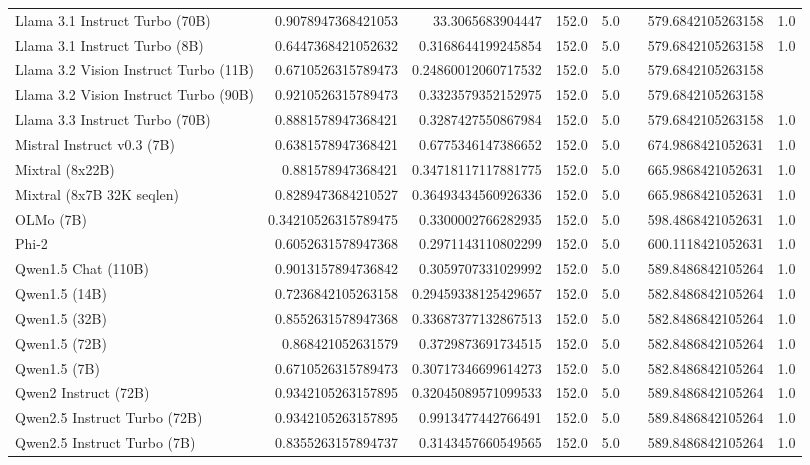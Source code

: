\begin{table}[htp]
{\begin{tabular}{lrrrrrrr}
Llama 3.1 Instruct Turbo (70B) & 0.9078947368421053 & 33.3065683904447 & 152.0 & 5.0 &  & 579.6842105263158 & 1.0 \\
Llama 3.1 Instruct Turbo (8B) & 0.6447368421052632 & 0.3168644199245854 & 152.0 & 5.0 &  & 579.6842105263158 & 1.0 \\
Llama 3.2 Vision Instruct Turbo (11B) & 0.6710526315789473 & 0.24860012060717532 & 152.0 & 5.0 &  & 579.6842105263158 &  \\
Llama 3.2 Vision Instruct Turbo (90B) & 0.9210526315789473 & 0.3323579352152975 & 152.0 & 5.0 &  & 579.6842105263158 &  \\
Llama 3.3 Instruct Turbo (70B) & 0.8881578947368421 & 0.3287427550867984 & 152.0 & 5.0 &  & 579.6842105263158 & 1.0 \\
Mistral Instruct v0.3 (7B) & 0.6381578947368421 & 0.6775346147386652 & 152.0 & 5.0 &  & 674.9868421052631 & 1.0 \\
Mixtral (8x22B) & 0.881578947368421 & 0.34718117117881775 & 152.0 & 5.0 &  & 665.9868421052631 & 1.0 \\
Mixtral (8x7B 32K seqlen) & 0.8289473684210527 & 0.36493434560926336 & 152.0 & 5.0 &  & 665.9868421052631 & 1.0 \\
OLMo (7B) & 0.34210526315789475 & 0.3300002766282935 & 152.0 & 5.0 &  & 598.4868421052631 & 1.0 \\
Phi-2 & 0.6052631578947368 & 0.2971143110802299 & 152.0 & 5.0 &  & 600.1118421052631 & 1.0 \\
Qwen1.5 Chat (110B) & 0.9013157894736842 & 0.3059707331029992 & 152.0 & 5.0 &  & 589.8486842105264 & 1.0 \\
Qwen1.5 (14B) & 0.7236842105263158 & 0.29459338125429657 & 152.0 & 5.0 &  & 582.8486842105264 & 1.0 \\
Qwen1.5 (32B) & 0.8552631578947368 & 0.33687377132867513 & 152.0 & 5.0 &  & 582.8486842105264 & 1.0 \\
Qwen1.5 (72B) & 0.868421052631579 & 0.3729873691734515 & 152.0 & 5.0 &  & 582.8486842105264 & 1.0 \\
Qwen1.5 (7B) & 0.6710526315789473 & 0.30717346699614273 & 152.0 & 5.0 &  & 582.8486842105264 & 1.0 \\
Qwen2 Instruct (72B) & 0.9342105263157895 & 0.32045089571099533 & 152.0 & 5.0 &  & 589.8486842105264 & 1.0 \\
Qwen2.5 Instruct Turbo (72B) & 0.9342105263157895 & 0.9913477442766491 & 152.0 & 5.0 &  & 589.8486842105264 & 1.0 \\
Qwen2.5 Instruct Turbo (7B) & 0.8355263157894737 & 0.3143457660549565 & 152.0 & 5.0 &  & 589.8486842105264 & 1.0 \\

\end{tabular}}
\end{table}

